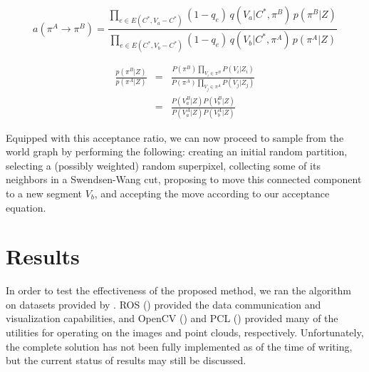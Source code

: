 \documentclass[10pt,letterpaper]{article}
\begin{document}
\begin{equation}
a(\pi^{A}\rightarrow \pi^{B})=\frac{\prod_{e\in E(C^{*},V_{a}-C^{*})}(1-q_{e})\, q(V_{a}|C^{*},\pi^{B})\, p(\pi^{B}|Z)}{\prod_{e\in E(C^{*},V_{b}-C^{*})}(1-q_{e})\, q(V_{b}|C^{*},\pi^{A})\, p(\pi^{A}|Z)}\label{eq: acceptanceRatio}
\end{equation}

\begin{eqnarray}
\frac{p(\pi^{B}|Z)}{p(\pi^{A}|Z)} & = & \frac{P(\pi^{B})\prod_{V_{i}\in \pi^{B}}P(V_{i}|Z_{i})}{P(\pi^{A})\prod_{V_{j}\in \pi^{A}}P(V_{j}|Z_{j})}\nonumber \\
 & = & \frac{P(V_{a}^{B}|Z)P(V_{b}^{B}|Z)}{P(V_{a}^{A}|Z)P(V_{b}^{A}|Z)}\label{eq:jumpProb}
\end{eqnarray}

	Equipped with this acceptance ratio, we can now proceed to sample from the world graph by performing the following: creating an initial random partition, selecting a (possibly weighted) random superpixel, collecting some of its neighbors in a Swendsen-Wang cut, proposing to move this connected component to a new segment $V_b$, and accepting the move according to our acceptance equation.


%

\section{Results}
	In order to test the effectiveness of the proposed method, we ran the algorithm on datasets provided by \cite{sturm12iros}. ROS (\cite{ros2009}) provided the data communication and visualization capabilities, and OpenCV (\cite{opencv_library}) and PCL (\cite{rusu20113d}) provided many of the utilities for operating on the images and point clouds, respectively. Unfortunately, the complete solution has not been fully implemented as of the time of writing, but the current status of results may still be discussed.
\end{document}

